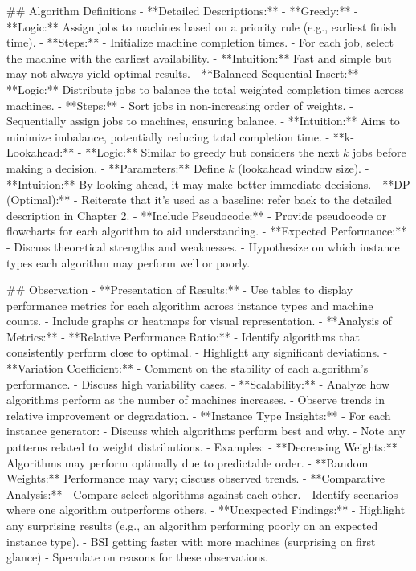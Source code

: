 \begin{markdown}
## Algorithm Definitions
- **Detailed Descriptions:**
  - **Greedy:**
    - **Logic:** Assign jobs to machines based on a priority rule (e.g., earliest finish
      time).
    - **Steps:**
      - Initialize machine completion times.
      - For each job, select the machine with the earliest availability.
    - **Intuition:** Fast and simple but may not always yield optimal results.
  - **Balanced Sequential Insert:**
    - **Logic:** Distribute jobs to balance the total weighted completion times across
      machines.
    - **Steps:**
      - Sort jobs in non-increasing order of weights.
      - Sequentially assign jobs to machines, ensuring balance.
    - **Intuition:** Aims to minimize imbalance, potentially reducing total completion time.
  - **k-Lookahead:**
    - **Logic:** Similar to greedy but considers the next $k$ jobs before making a decision.
    - **Parameters:** Define $k$ (lookahead window size).
    - **Intuition:** By looking ahead, it may make better immediate decisions.
  - **DP (Optimal):**
    - Reiterate that it's used as a baseline; refer back to the detailed description in
      Chapter 2.
  - **Include Pseudocode:**
    - Provide pseudocode or flowcharts for each algorithm to aid understanding.
- **Expected Performance:**
  - Discuss theoretical strengths and weaknesses.
  - Hypothesize on which instance types each algorithm may perform well or poorly.

## Observation
- **Presentation of Results:**
  - Use tables to display performance metrics for each algorithm across instance types and machine counts.
  - Include graphs or heatmaps for visual representation.
- **Analysis of Metrics:**
  - **Relative Performance Ratio:**
    - Identify algorithms that consistently perform close to optimal.
    - Highlight any significant deviations.
  - **Variation Coefficient:**
    - Comment on the stability of each algorithm's performance.
    - Discuss high variability cases.
  - **Scalability:**
    - Analyze how algorithms perform as the number of machines increases.
    - Observe trends in relative improvement or degradation.
- **Instance Type Insights:**
  - For each instance generator:
    - Discuss which algorithms perform best and why.
    - Note any patterns related to weight distributions.
  - Examples:
    - **Decreasing Weights:** Algorithms may perform optimally due to predictable order.
    - **Random Weights:** Performance may vary; discuss observed trends.
- **Comparative Analysis:**
  - Compare select algorithms against each other.
  - Identify scenarios where one algorithm outperforms others.
- **Unexpected Findings:**
  - Highlight any surprising results (e.g., an algorithm performing poorly on an expected instance type).
    - BSI getting faster with more machines (surprising on first glance)
  - Speculate on reasons for these observations.


\end{markdown}
